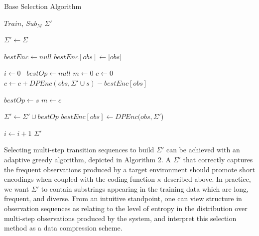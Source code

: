 \documentclass[letterpaper]{article}
\begin{document}
\begin{algorithm}
\caption{Base Selection Algorithm}
\label{Base Selection Algorithm}
\begin{algorithmic}[1]
\INPUT $Train$, $Sub_M$
\OUTPUT $\Sigma'$

\State $\Sigma' \gets \Sigma$

\State $bestEnc \gets null$
	\State $bestEnc[obs] \gets |obs|$
\EndFor

\State $i \gets 0$\
	\State $bestOp \gets null$
	\State $m \gets 0$
		\State $c \gets 0$
			\State $c \gets c+DPEnc(obs, \Sigma' \cup s)-bestEnc[obs]$
		\EndFor
		
			\State $bestOp \gets s$
			\State $m \gets c$
		\EndIf
		
	\EndFor

	\State $\Sigma' \gets \Sigma' \cup bestOp$
		\State $bestEnc[obs] \gets DPEnc(obs,\Sigma'$) 
	\EndFor	
	
	\State $i \gets i + 1$
\EndWhile 
\State \Return $\Sigma'$

\EndProcedure
\end{algorithmic}
\end{algorithm}

Selecting multi-step transition sequences to build $\Sigma'$ can be achieved with an adaptive greedy algorithm, depicted in Algorithm 2. A $\Sigma'$ that correctly captures the frequent observations produced by a target environment should promote short encodings when coupled with the coding function $\kappa$ described above. In practice, we want $\Sigma'$ to contain substrings appearing in the training data which are long, frequent, and diverse. From an intuitive standpoint, one can view structure in observation sequences as relating to the level of entropy in the distribution over multi-step observations produced by the system, and interpret this selection method as a data compression scheme. 
\end{document}
